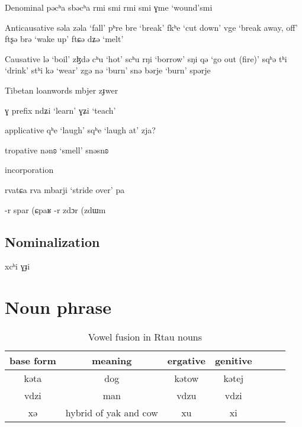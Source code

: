 \documentclass[oneside,a4paper,11pt]{article}
\newcommand{\ipa}[1]{{\phon #1}} %
\begin{document}
 Denominal
 \ipa{pəcʰa} \ipa{sbəcʰa}
  \ipa{rmi} \ipa{smi}
    \ipa{rmi} \ipa{smi}
        \ipa{ɣme} `wound'\ipa{smi}
 
 
 Anticausative
 \ipa{səla}  \ipa{zəla}  `fall'
\ipa{pʰre}   \ipa{bre}  `break'
  \ipa{fkʰe} `cut down'  \ipa{vge} `break away, off' 
\ipa{ftʂə} \ipa{brə} `wake up' 
\ipa{ftɕə} \ipa{dʑə} `melt' 
 
 
 Causative
 \ipa{lə}  `boil' \ipa{zɮdə}
  \ipa{cʰu}  `hot' \ipa{scʰu}
    \ipa{rŋi}  `borrow' \ipa{sŋi}
    \ipa{qə}  `go out (fire)' \ipa{sqʰə}
    \ipa{tʰi}  `drink' \ipa{stʰi}
    \ipa{kə}  `wear' \ipa{zgə}
     \ipa{nə}  `burn' \ipa{snə}
     \ipa{bərje}  `burn' \ipa{spərje}

 Tibetan loanwords \ipa{mbjer} \ipa{zɟwer}
 
\ipa{ɣ} prefix
     \ipa{ndʑi} `learn'      \ipa{ɣʑi} `teach'
     

         
    applicative
    \ipa{qʰe}  `laugh' \ipa{sqʰe} `laugh at'
 zja?
 
 
     tropative
       \ipa{nənʚ}  `smell' \ipa{snəsnʚ}

incorporation

\ipa{rvatɕa} \ipa{rva}
\ipa{mbarji} `stride over' \ipa{pa}

\ipa{-r} \ipa{spar} (\ipa{ɕpaʁ}
\ipa{-r} \ipa{zdɔr} (\ipa{zdɯm}

\subsection{Nominalization}

\ipa{xcʰi} \ipa{ɣɟi}

 \section{Noun phrase}
\begin{table}[H]
\caption{Vowel fusion in Rtau nouns} \label{tab:alternation.noun} \centering
\begin{tabular}{c|cccccc}
\toprule
base form & meaning & ergative & genitive \\
\midrule
\ipa{kəta} & dog & \ipa{kətow} & \ipa{kətej} & \\
\ipa{vdzi} & man & \ipa{vdzu} & \ipa{vdzi} & \\
\ipa{xə} & hybrid of yak and cow & \ipa{xu} & \ipa{xi} & \\
\bottomrule
\end{tabular}
\end{table}
\end{document}
